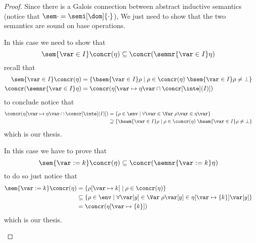 \begin{proof}
  Since there is a Galois connection between abstract inductive
  semantics (notice that \(\sem\cdot = \semi[\dom]{\cdot}\)), We just
  need to show that the two semantics are sound on base operations.

  \begin{inductive}
     In this case we need to show that
    \begin{equation*}
      \sem{\var\in I}\concr(\eta) \subseteq \concr(\semnr{\var \in I}\eta)
    \end{equation*}
    recall that
    \begin{align*}
      \sem{\var\in I}\concr(\eta) & = \{\bsem{\var\in I}\rho \mid \rho \in \concr(\eta) \; \bsem{\var\in I}\rho \neq \bot\} \\
      \concr(\semnr{\var\in I}\eta) & = \concr(\eta[\var\mapsto\eta\var\cap\concr[\inte](I)]) 
    \end{align*}
    to conclude notice that
    \begin{align*}
      \concr(\eta[\var\mapsto\eta\var\cap\concr[\inte](I)]) & = \{\rho \in \env \mid \forall \var\in\Var \; \rho\var\in\eta\var\} \\
                                                            & \supseteq \{\bsem{\var\in I}\rho \mid \rho \in \concr(\eta) \; \bsem{\var\in I}\rho \neq \bot\}
    \end{align*}
    which is our thesis.

     In this case we have to prove that
    \begin{equation*}
      \sem{\var := k}\concr(\eta) \subseteq \concr(\semnr{\var := k}\eta)
    \end{equation*}
    to do so just notice that
    \begin{align*}
      \sem{\var := k}\concr(\eta) & = \{\rho[\var\mapsto k] \mid \rho \in \concr(\eta)\} \\
                                  & \subseteq \{\rho \in \env \mid \forall \var[y] \in \Var \; \rho\var[y] \in \eta[\var\mapsto \{k\}]\var[y]\} \\
                                  & = \concr(\eta[\var\mapsto \{k\}])
    \end{align*}
    which is our thesis.


\end{inductive}
\end{proof}
